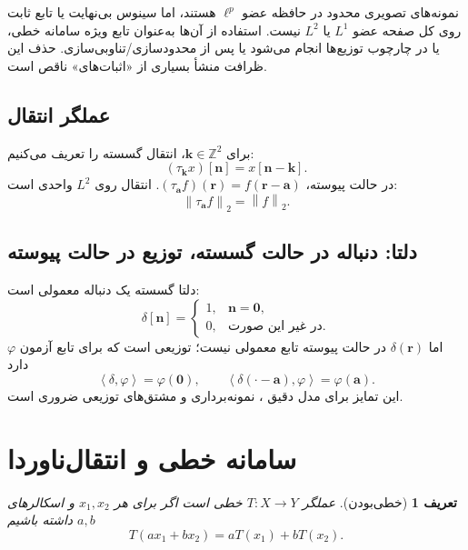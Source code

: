 \documentclass[12pt,openany,oneside]{book}
\newtheorem{definition}{تعریف}[chapter]
\newcommand{\Z}{\mathbb{Z}}
\newcommand{\norm}[1]{\left\lVert #1\right\rVert}
\newcommand{\inner}[2]{\left\langle #1,#2\right\rangle}
\newcommand{\vect}[1]{\bm{#1}}
\begin{document}
\begin{warningbox}
نمونه‌های تصویری محدود در حافظه عضو \(\ell^p\) هستند، اما سینوس بی‌نهایت یا تابع ثابت روی کل صفحه عضو
\(L^1\) یا \(L^2\) نیست. استفاده از آن‌ها به‌عنوان تابع ویژه سامانه خطی، یا در چارچوب توزیع‌ها انجام می‌شود
یا پس از محدودسازی/تناوبی‌سازی. حذف این ظرافت منشأ بسیاری از «اثبات‌های» ناقص است.
\end{warningbox}

\subsection{عملگر انتقال}
برای \(\vect k\in\Z^2\)، انتقال گسسته را تعریف می‌کنیم:
\begin{equation}
(\tau_{\vect k}x)[\vect n]=x[\vect n-\vect k].
\end{equation}
در حالت پیوسته، \((\tau_{\vect a}f)(\vect r)=f(\vect r-\vect a)\). انتقال روی \(L^2\) واحدی است:
\begin{equation}
\norm{\tau_{\vect a}f}_2=\norm{f}_2.
\end{equation}

\subsection{دلتا: دنباله در حالت گسسته، توزیع در حالت پیوسته}
دلتا گسسته یک دنباله معمولی است:
\begin{equation}
\delta[\vect n]=\begin{cases}1,&\vect n=\mathbf{0},\\0,&\text{در غیر این صورت.}\end{cases}
\end{equation}
اما \(\delta(\vect r)\) در حالت پیوسته تابع معمولی نیست؛ توزیعی است که برای تابع آزمون \(\varphi\) دارد
\begin{equation}
\inner{\delta}{\varphi}=\varphi(\mathbf{0}),
\qquad
\inner{\delta(\cdot-\vect a)}{\varphi}=\varphi(\vect a).
\end{equation}
این تمایز برای مدل دقیق ، نمونه‌برداری و مشتق‌های توزیعی ضروری است.

\section{سامانه خطی و انتقال‌ناوردا}

\begin{definition}[خطی‌بودن]
عملگر \(T:X\to Y\) خطی است اگر برای هر \(x_1,x_2\) و اسکالرهای \(a,b\) داشته باشیم
\begin{equation}
T(ax_1+bx_2)=aT(x_1)+bT(x_2).
\end{equation}
\end{definition}
\end{document}
